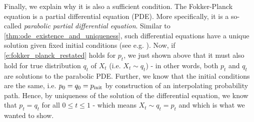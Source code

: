 Finally, we explain why it is also a sufficient condition. The Fokker-Planck equation is a partial differential equation (PDE). More specifically, it is a so-called \emph{parabolic partial differential equation}. Similar to \cref{thm:ode_existence_and_uniqueness}, such differential equations have a unique solution given fixed initial conditions (see e.g. \citep[Chapter 7]{evans2022partial}). Now, if \cref{e:fokker_planck_restated} holds for $p_t$, we just shown above that it must also hold for true distribution $q_t$ of $X_t$ (i.e. $X_t\sim q_t$) - in other words, both $p_t$ and $q_t$ are solutions to the parabolic PDE. Further, we know that the initial conditions are the same, i.e. $p_0=q_0=p_{\rm{init}}$ by construction of an interpolating probability path. Hence, by uniqueness of the solution of the differential equation, we know that $p_t=q_t$ for all $0\leq t\leq 1$ - which means $X_t\sim q_t=p_t$ and which is what we wanted to show.